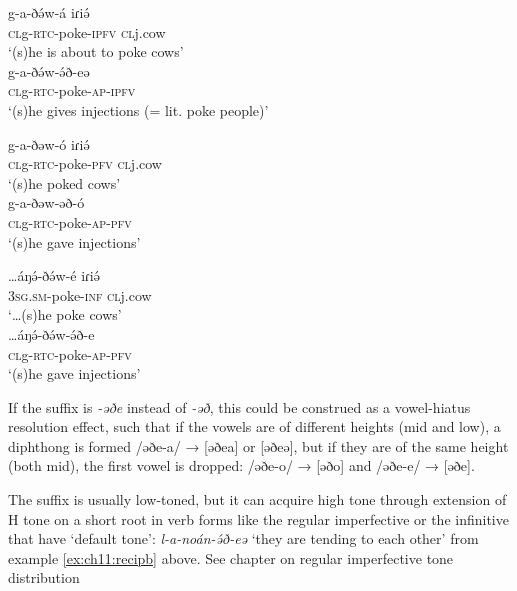 \ea
\ea \gll 	g-a-ðə́w-á 			iɾiə́  		\\
	\textsc{cl}g-\textsc{rtc}-poke-\textsc{ipfv}  	\textsc{cl}j.cow\\
	\glt ‘(s)he is about to poke cows’\\

\ex \gll	g-a-ðə́w-ə́ð-eə  		\\
	\textsc{cl}g-\textsc{rtc}-poke-\textsc{ap-\textsc{ipfv}}  \\
	\glt ‘(s)he gives injections (= lit.  poke people)’\\ \label{ex:ch11:eab}

\ex \gll 	g-a-ðəw-ó 			iɾiə́		\\
	\textsc{cl}g-\textsc{rtc}-poke-\textsc{pfv}  		\textsc{cl}j.cow\\
	\glt 	‘(s)he poked cows’\\

\ex \gll 	g-a-ðəw-əð-ó		\\
	\textsc{cl}g-\textsc{rtc}-poke-\textsc{ap-\textsc{pfv}}  		 \\
	\glt ‘(s)he gave injections’\\ \label{ex:ch11:eab}

\ex \gll 	…áŋə́-ðə́w-é 			iɾiə́		\\
	3\textsc{sg.sm}-poke-\textsc{inf}  		\textsc{cl}j.cow\\
	\glt 	‘…(s)he poke cows’\\

\ex \gll 	…áŋə́-ðə́w-ə́ð-e	\\
	\textsc{cl}g-\textsc{rtc}-poke-\textsc{ap-\textsc{pfv}}  		 \\
	\glt ‘(s)he gave injections’	\\ \label{ex:ch11:eaf}
\z
\z



If the suffix is \textit{-əðe} instead of \textit{-əð}, this could be construed as a vowel-hiatus resolution effect, such that if the vowels are of different heights (mid and low), a diphthong is formed /əðe-a/ → [əðea] or [əðeə], but if they are of the same height (both mid), the first vowel is dropped: /əðe-o/ → [əðo] and /əðe-e/ → [əðe]. 

The suffix is usually low-toned, but it can acquire high tone through extension of H tone on a short root in verb forms like the regular imperfective or the infinitive that have ‘default tone’:  \textit{l-a-noán-ə́ð-eə}  ‘they are tending to each other’ from example \ref{ex:ch11:recipb} above. See chapter on regular imperfective tone distribution

